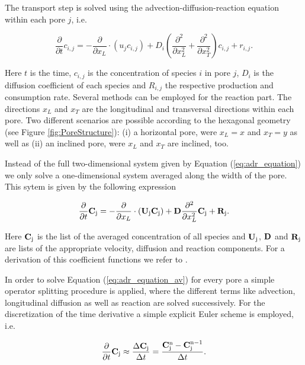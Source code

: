 \documentclass[12pt]{report}
\begin{document}
The transport step is solved using the advection-diffusion-reaction equation within each pore $j$, i.e.

\begin{equation}\label{eq:adr_equation}
	\frac{\partial}{\partial t} c_{i,j} = - \frac{\partial}{\partial x_L} \cdot ( u_j c_{i,j}) + D_i \left( \frac{\partial^2}{\partial x_L^2} + \frac{\partial^2}{\partial x_T^2} \right) c_{i,j} + r_{i,j}.
\end{equation}


Here $t$ is the time, $c_{i,j}$ is the concentration of species $i$ in pore $j$, $D_i$ is the diffusion coefficient of each species and $R_{i,j}$ the respective production and consumption rate. Several methods can be employed for the reaction part. The directions $x_L$ and $x_T$ are the longitudinal and transversal directions within each pore. Two different scenarios are possible according to the hexagonal geometry (see Figure \ref{fig:PoreStructure}): (i) a horizontal pore, were $x_L = x$ and $x_T = y$ as well as (ii) an inclined pore, were $x_L$ and $x_T$ are inclined, too.

Instead of the full two-dimensional system given by Equation (\ref{eq:adr_equation}) we only solve a one-dimensional system averaged along the width of the pore. This sytem is given by the following expression

\begin{equation}\label{eq:adr_equation_av}
	\frac{\partial}{\partial t} {\bf C}_{\rm{j}} = - \frac{\partial}{\partial x_L} \cdot ( {\bf U}_{\rm{j}} {\bf C}_{\rm{j}}) + {\bf D} \frac{\partial^2}{\partial x_L^2} {\bf C}_{\rm{j}} + {\bf R}_{\rm{j}}.
\end{equation}

Here ${\bf C}_{\rm{j}}$ is the list of the averaged concentration of all species and ${\bf U}_{\rm{j}}$, ${\bf D}$ and ${\bf R}_{\rm{j}}$ are lists of the appropriate velocity, diffusion and reaction components. For a derivation of this coefficient functions we refer to \citep{Hesse2010}.

In order to solve Equation (\ref{eq:adr_equation_av}) for every pore a simple operator splitting procedure is applied, where the different terms like advection, longitudinal diffusion as well as reaction are solved successively. For the discretization of the time derivative a simple explicit Euler scheme is employed, i.e.

$$
	\frac{\partial}{\partial t} {\bf C}_{\rm{j}} \approx \frac{\Delta {\bf C}_{\rm{j}}}{\Delta t} = \frac{{\bf C}_{\rm{j}}^{\rm{n}} - {\bf C}_{\rm{j}}^{\rm{n} - 1}}{\Delta t} .
$$
\end{document}
